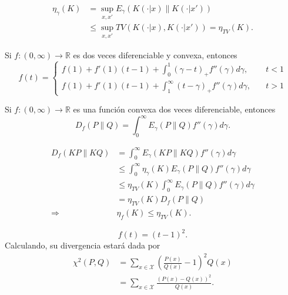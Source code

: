 \begin{corollary}
\begin{align*}
    \eta_\gamma(K)&=\sup_{x,x'}E_\gamma(K(\cdot|x)\|K(\cdot|x'))\\
    &\leq\sup_{x,x'}TV(K(\cdot|x),K(\cdot|x'))=\eta_{TV}(K).
\end{align*}
\end{corollary}

\begin{theorem}
Si $f\colon(0,\infty)\to\mathbb{R}$ es dos veces diferenciable y convexa, entonces
\begin{equation*}
    f(t)=\begin{cases}
    f(1)+f'(1)(t-1)+\int_0^1(\gamma-t)_+f''(\gamma)d\gamma,&\quad t<1\\
    f(1)+f'(1)(t-1)+\int_1^\infty(t-\gamma)_+f''(\gamma)d\gamma,&\quad t>1
    \end{cases}
\end{equation*}
\end{theorem}

\begin{theorem}
Si $f\colon(0,\infty)\to\mathbb{R}$ es una funci\'on convexa dos veces diferenciable, entonces
\begin{equation*}
    D_f(P\|Q)=\int_0^\infty E_\gamma(P\|Q)f''(\gamma)d\gamma.
\end{equation*}
\end{theorem}

\begin{corollary}
\begin{align*}
    D_f(KP\|KQ)&=\int_0^\infty E_\gamma(KP\|KQ)f''(\gamma)d\gamma\\
    &\leq\int_0^\infty\eta_\gamma(K)E_\gamma(P\|Q)f''(\gamma)d\gamma\\
    &\leq\eta_{TV}(K)\int_0^\infty E_\gamma(P\|Q)f''(\gamma)d\gamma\\
    &=\eta_{TV}(K)D_f(P\|Q)\\
    \Longrightarrow&\eta_f(K)\leq\eta_{TV}(K).
\end{align*}    
\end{corollary}

\begin{notation}
\begin{equation*}
    f(t)=(t-1)^2.
\end{equation*} 
Calculando, su divergencia estar\'a dada por
\begin{align*}
    \chi^2(P,Q)&=\sum_{x\in\mathcal{X}}\left(\frac{P(x)}{Q(x)}-1\right)^2Q(x)\\
    &=\sum_{x\in\mathcal{X}}\frac{(P(x)-Q(x))^2}{Q(x)}.
\end{align*}
\end{notation}

